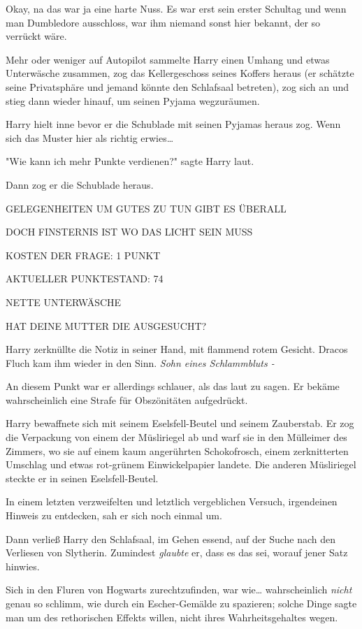 {Okay, na das war ja eine harte Nuss. Es war erst sein erster Schultag und wenn man Dumbledore ausschloss, war ihm niemand sonst hier bekannt, der so verrückt wäre.

Mehr oder weniger auf Autopilot sammelte Harry einen Umhang und etwas Unterwäsche zusammen, zog das Kellergeschoss seines Koffers heraus (er schätzte seine Privatsphäre und jemand könnte den Schlafsaal betreten), zog sich an und stieg dann wieder hinauf, um seinen Pyjama wegzuräumen.

Harry hielt inne bevor er die Schublade mit seinen Pyjamas heraus zog. Wenn sich das Muster hier als richtig erwies…

"Wie kann ich mehr Punkte verdienen?" sagte Harry laut.

Dann zog er die Schublade heraus.

GELEGENHEITEN UM GUTES ZU TUN GIBT ES ÜBERALL

DOCH FINSTERNIS IST WO DAS LICHT SEIN MUSS

KOSTEN DER FRAGE: 1 PUNKT

AKTUELLER PUNKTESTAND: 74

NETTE UNTERWÄSCHE

HAT DEINE MUTTER DIE AUSGESUCHT?

Harry zerknüllte die Notiz in seiner Hand, mit flammend rotem Gesicht. Dracos Fluch kam ihm wieder in den Sinn. \emph{Sohn eines Schlammbluts -}

An diesem Punkt war er allerdings schlauer, als das laut zu sagen. Er bekäme wahrscheinlich eine Strafe für Obszönitäten aufgedrückt.

Harry bewaffnete sich mit seinem Eselsfell-Beutel und seinem Zauberstab. Er zog die Verpackung von einem der Müsliriegel ab und warf sie in den Mülleimer des Zimmers, wo sie auf einem kaum angerührten Schokofrosch, einem zerknitterten Umschlag und etwas rot-grünem Einwickelpapier landete. Die anderen Müsliriegel steckte er in seinen Eselsfell-Beutel.

In einem letzten verzweifelten und letztlich vergeblichen Versuch, irgendeinen Hinweis zu entdecken, sah er sich noch einmal um.

Dann verließ Harry den Schlafsaal, im Gehen essend, auf der Suche nach den Verliesen von Slytherin. Zumindest \emph{glaubte} er, dass es das sei, worauf jener Satz hinwies.

Sich in den Fluren von Hogwarts zurechtzufinden, war wie… wahrscheinlich \emph{nicht} genau so schlimm, wie durch ein Escher-Gemälde zu spazieren; solche Dinge sagte man um des rethorischen Effekts willen, nicht ihres Wahrheitsgehaltes wegen.

}
